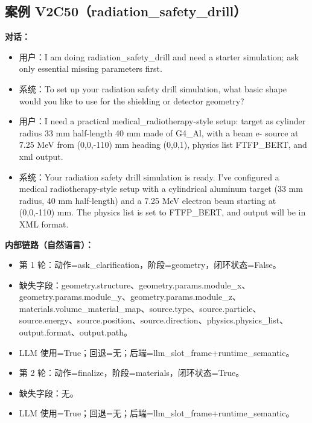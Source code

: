 \documentclass[11pt]{ctexart}
\begin{document}
\subsection{案例 V2C50（radiation\_safety\_drill）}
\textbf{对话：}
\begin{itemize}
\item 用户：I am doing radiation\_safety\_drill and need a starter simulation; ask only essential missing parameters first.
\item 系统：To set up your radiation safety drill simulation, what basic shape would you like to use for the shielding or detector geometry?
\item 用户：I need a practical medical\_radiotherapy-style setup: target as cylinder radius 33 mm half-length 40 mm made of G4\_Al, with a beam e- source at 7.25 MeV from (0,0,-110) mm heading (0,0,1), physics list FTFP\_BERT, and xml output.
\item 系统：Your radiation safety drill simulation is ready. I've configured a medical radiotherapy-style setup with a cylindrical aluminum target (33 mm radius, 40 mm half-length) and a 7.25 MeV electron beam starting at (0,0,-110) mm. The physics list is set to FTFP\_BERT, and output will be in XML format.
\end{itemize}
\textbf{内部链路（自然语言）：}
\begin{itemize}
\item 第 1 轮：动作=ask\_clarification，阶段=geometry，闭环状态=False。
\item 缺失字段：geometry.structure、geometry.params.module\_x、geometry.params.module\_y、geometry.params.module\_z、materials.volume\_material\_map、source.type、source.particle、source.energy、source.position、source.direction、physics.physics\_list、output.format、output.path。
\item LLM 使用=True；回退=无；后端=llm\_slot\_frame+runtime\_semantic。
\item 第 2 轮：动作=finalize，阶段=materials，闭环状态=True。
\item 缺失字段：无。
\item LLM 使用=True；回退=无；后端=llm\_slot\_frame+runtime\_semantic。
\end{itemize}
\end{document}
